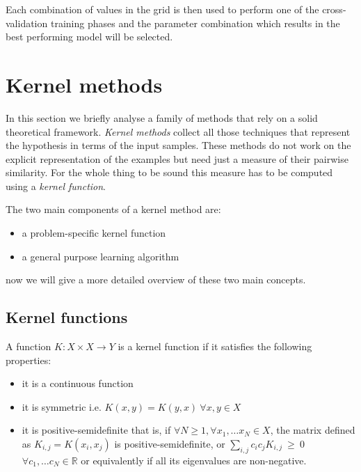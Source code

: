 Each combination of values in the grid is then used to perform one of the cross-validation
training phases and the parameter combination which results in the best performing model
will be selected.


\section{Kernel methods}
\label{sec:kernel}

In this section we briefly analyse a family of methods that rely on a solid
theoretical framework.
\emph{Kernel methods} collect all those techniques that represent the hypothesis
in terms of the input samples.
These methods do not work on the explicit representation of the examples but
need just a measure of their pairwise similarity.
For the whole thing to be sound this measure has to be computed using a
\emph{kernel function}.

The two main components of a kernel method are:
\begin{itemize}
    \item a problem-specific kernel function
    \item a general purpose learning algorithm
\end{itemize}
now we will give a more detailed overview of these two main concepts.

\subsection{Kernel functions}
\label{subsec:kernelfunc}
A function $K:X\times X \to Y$ is a kernel function if it satisfies the following properties:
\begin{itemize}
    \item it is a continuous function
    \item it is symmetric i.e. $K(x,y) = K(y,x)~\forall x,y \in X$
    \item it is positive-semidefinite that is, if $\forall N\geq 1, \forall x_1,\dots x_N \in X$,
        the matrix defined as $K_{i,j} = K(x_i,x_j)$ is positive-semidefinite,
        or $\sum_{i,j}c_ic_jK_{i,j}~\geq~0$ $\forall c_1,\dots c_N \in \mathbb{R}$
        or equivalently if all its eigenvalues are non-negative.
\end{itemize}

